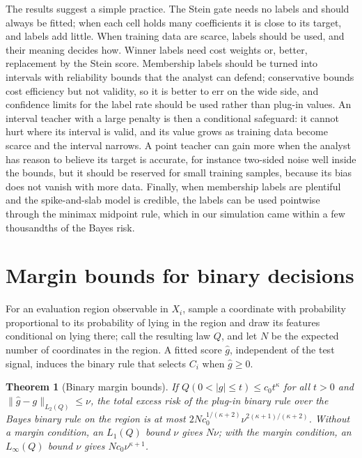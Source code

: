 \documentclass[11pt]{article}
\theoremstyle{plain}
\newtheorem{theorem}{Theorem}
\theoremstyle{definition}
\theoremstyle{remark}
\begin{document}
The results suggest a simple practice. The Stein gate needs no labels and should always be
fitted; when each cell holds many coefficients it is close to its target, and labels add little.
When training data are scarce, labels should be used, and their meaning decides how. Winner
labels need cost weights or, better, replacement by the Stein score. Membership labels should be
turned into intervals with reliability bounds that the analyst can defend; conservative bounds
cost efficiency but not validity, so it is better to err on the wide side, and confidence limits
for the label rate should be used rather than plug-in values. An interval teacher with a large
penalty is then a conditional safeguard: it cannot hurt where its interval is valid, and its
value grows as training data become scarce and the interval narrows. A point teacher can gain
more when the analyst has reason to believe its target is accurate, for instance two-sided noise
well inside the bounds, but it should be reserved for small training samples, because its bias
does not vanish with more data. Finally, when membership labels are plentiful and the
spike-and-slab model is credible, the labels can be used pointwise through the minimax midpoint
rule, which in our simulation came within a few thousandths of the Bayes risk.

\appendix

\section{Margin bounds for binary decisions}\label{app:margin}

For an evaluation region observable in $X_i$, sample a coordinate with probability
proportional to its probability of lying in the region and draw its features conditional on
lying there; call the resulting law $Q$, and let $N$ be the expected number of coordinates in
the region. A fitted score $\widehat g$, independent of the test signal, induces the binary
rule that selects $C_i$ when $\widehat g\ge0$.

\begin{theorem}[Binary margin bounds]\label{thm:margin}
If $Q(0<|g|\le t)\le c_0t^\kappa$ for all $t>0$ and $\|\widehat g-g\|_{L_2(Q)}\le\nu$,
the total excess risk of the plug-in binary rule over the Bayes binary rule on the region is
at most $2Nc_0^{1/(\kappa+2)}\nu^{2(\kappa+1)/(\kappa+2)}$. Without a margin
condition, an $L_1(Q)$ bound $\nu$ gives $N\nu$; with the margin condition,
an $L_\infty(Q)$ bound $\nu$ gives $Nc_0\nu^{\kappa+1}$.
\end{theorem}
\end{document}
